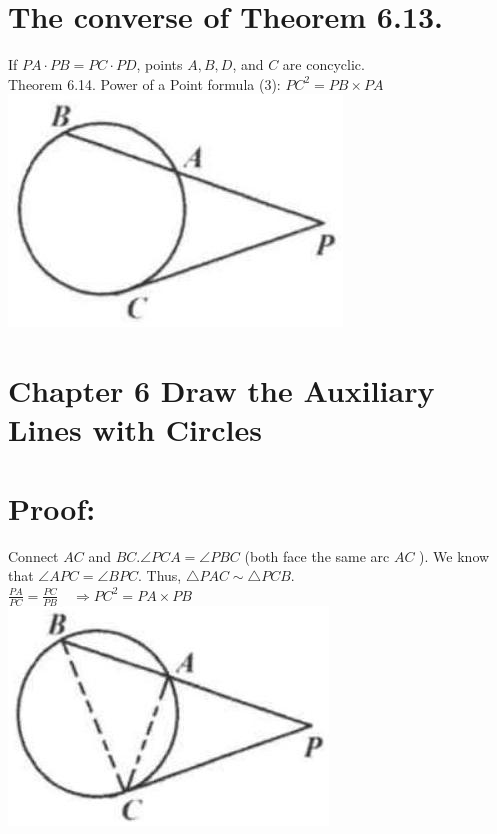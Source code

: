 \documentclass[10pt]{article}
\begin{document}
\section*{The converse of Theorem 6.13.}
If \(P A \cdot P B=P C \cdot P D\), points \(A, B, D\), and \(C\) are concyclic.\\
Theorem 6.14. Power of a Point formula (3): \(P C^{2}=P B \times P A\)\\
\includegraphics[max width=\textwidth, center]{2025_04_17_97bc1f7e44d93c271a88g-192(4)}

\section*{Chapter 6 Draw the Auxiliary Lines with Circles}
\section*{Proof:}
Connect \(A C\) and \(B C . \angle P C A=\angle P B C\) (both face the same arc \(A C\) ). We know that \(\angle A P C=\angle B P C\). Thus, \(\triangle P A C \sim \triangle P C B\).\\
\(\frac{P A}{P C}=\frac{P C}{P B} \quad \Rightarrow P C^{2}=P A \times P B\)\\
\includegraphics[max width=\textwidth, center]{2025_04_17_97bc1f7e44d93c271a88g-193}
\end{document}
